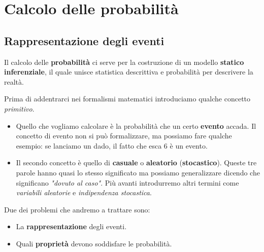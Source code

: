 \part{Calcolo delle probabilità}

\chapter{Rappresentazione degli eventi}
Il calcolo delle \textbf{probabilità} ci serve per la costruzione di un modello
\textbf{statico inferenziale}, il quale unisce statistica descrittiva e probabilità per descrivere la
realtà.

Prima di addentrarci nei formalismi matematici introduciamo qualche concetto \emph{primitivo}.
\begin{itemize}
	\item Quello che vogliamo calcolare è la probabilità che un certo \textbf{evento} accada. Il concetto
	      di evento non si può formalizzare, ma possiamo fare qualche esempio: se lanciamo un dado, il
	      fatto che esca 6 è un evento.
	\item Il secondo concetto è quello di \textbf{casuale} o \textbf{aleatorio} (\textbf{stocastico}).
	      Queste tre parole hanno quasi lo stesso significato ma possiamo generalizzare dicendo che
	      significano \emph{"dovuto al caso"}. Più avanti introdurremo altri termini come
	      \emph{variabili aleatorie} e \emph{indipendenza stocastica}.
\end{itemize}
Due dei problemi che andremo a trattare sono:
\begin{itemize}
	\item La \textbf{rappresentazione} degli eventi.
	\item Quali \textbf{proprietà} devono soddisfare le probabilità.
\end{itemize}
